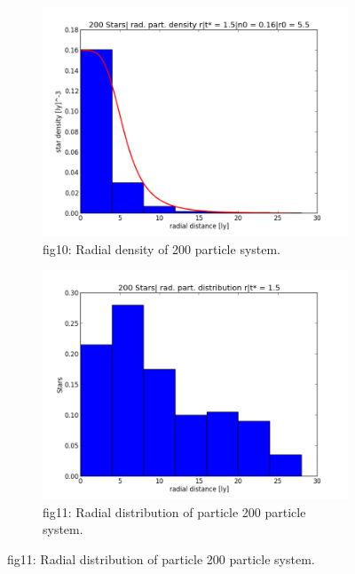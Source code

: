 \documentclass{article}
\begin{document}
\begin{figure}
\centering
\begin{subfigure}{.65\textwidth}
  \centering
  \hspace{-6cm}
  \includegraphics[scale=0.45]{g1-200.png}
  \caption{fig10: Radial density of 200 particle system.}
  \hspace{-6cm}
  \label{fig:sub1}
\end{subfigure}%
\begin{subfigure}{.65\textwidth}
  \hspace{-5cm}
  \centering
  \includegraphics[scale=0.45]{g2-200.png}
  \caption{fig11: Radial distribution of particle 200 particle system.}
  \label{fig:sub2}
\end{subfigure}
\label{fig:test}
\end{figure}
\end{document}
